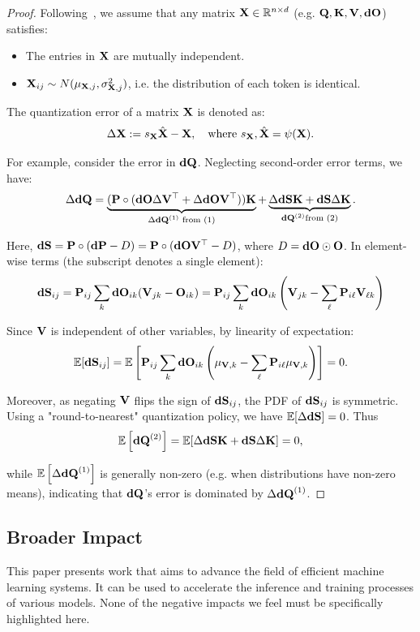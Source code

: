 \begin{proof}
Following~\citep{lin2023awq}, we assume that any matrix ${\bf X}\in\mathbb R^{n\times d}$ (e.g. $\mathbf{Q},\mathbf{K},\mathbf{V},\mathbf{dO}$) satisfies:

\begin{itemize}
    \item The entries in $\bf X$ are mutually independent.
    \item ${\bf X}_{ij} \sim N(\mu_{{\bf X},j},\sigma_{{\bf X},j}^2)$, i.e. the distribution of each token is identical.
\end{itemize}

The quantization error of a matrix $\bf X$ is denoted as:
$$
\Delta{\bf X}:=s_{\bf X}\hat{\bf X} - {\bf X},\quad \text{where }s_{\bf X},\hat{\bf X} = \psi({\bf X}).
$$

For example, consider the error in $\mathbf{dQ}$. Neglecting second-order error terms, we have:
$$
\Delta\mathbf{dQ} = \underbrace{(\mathbf{P} \circ (\mathbf{dO}\Delta\mathbf{V}^\top + \Delta \mathbf{dO}\mathbf{V}^\top))\mathbf{K}}_{\Delta\mathbf{dQ}^{(1)} \text{ from (1)}} + \underbrace{\Delta \mathbf{dS} \mathbf{K} + \mathbf{dS} \Delta \mathbf{K}}_{\mathbf{dQ}^{(2)}\text{from (2)}}.
$$

Here, $\mathbf{dS}=\mathbf{P}\circ(\mathbf{dP}-D)=\mathbf{P}\circ(\mathbf{dO}\mathbf{V}^\top-D)$, where $D=\mathbf{dO}\odot\mathbf{O}$. In element-wise terms (the subscript denotes a single element):
$$
\mathbf{dS}_{ij} = \mathbf{P}_{ij} \sum_k \mathbf{dO}_{ik} (\mathbf{V}_{jk} - \mathbf{O}_{ik}) = \mathbf{P}_{ij}\sum_k \mathbf{dO}_{ik}\left(\mathbf{V}_{jk} - \sum_\ell \mathbf{P}_{i\ell}\mathbf{V}_{\ell k}\right)
$$

Since $\mathbf{V}$ is independent of other variables, by linearity of expectation:
$$
\mathbb E[\mathbf{dS}_{ij}] = \mathbb E\left[\mathbf{P}_{ij}\sum_k\mathbf{dO}_{ik}\left(\mu_{\mathbf{V},k}-\sum_\ell\mathbf{P}_{i\ell} \mu_{\mathbf{V},k}\right)\right] = 0.
$$

Moreover, as negating $\mathbf{V}$ flips the sign of $\mathbf{dS}_{ij}$, the PDF of $\mathbf{dS}_{ij}$ is symmetric. Using a "round-to-nearest" quantization policy, we have $\mathbb E[\Delta\mathbf{dS}]=0$. Thus
$$
\mathbb E\left[\mathbf{dQ}^{(2)}\right] = \mathbb E[\Delta\mathbf{dS}\mathbf{K} + \mathbf{dS}\Delta\mathbf{K}] = 0,
$$

while $\mathbb E\left[\Delta\mathbf{dQ}^{(1)}\right]$ is generally non-zero (e.g. when distributions have non-zero means), indicating that $\mathbf{dQ}$'s error is dominated by $\Delta\mathbf{dQ}^{(1)}$.

\end{proof}



\subsection{Broader Impact}
This paper presents work that aims to advance the field of efficient machine learning systems. It can be used to accelerate the inference and training processes of various models. None of the negative impacts we feel must be specifically highlighted here.